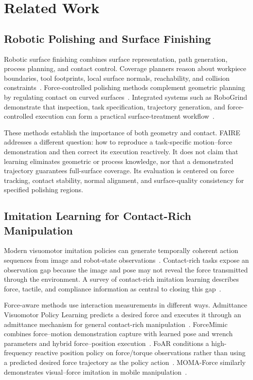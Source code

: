 \chapter{Related Work}
\label{chap:related_work}

\section{Robotic Polishing and Surface Finishing}
Robotic surface finishing combines surface representation, path generation, process planning, and contact control. Coverage planners reason about workpiece boundaries, tool footprints, local surface normals, reachability, and collision constraints~\cite{schneyer2023segmentation,mcgovern2024coverage,tafuro2024autonomous}. Force-controlled polishing methods complement geometric planning by regulating contact on curved surfaces~\cite{mohsin2019path,min2024force}. Integrated systems such as RoboGrind demonstrate that inspection, task specification, trajectory generation, and force-controlled execution can form a practical surface-treatment workflow~\cite{alt2024robogrind}.

These methods establish the importance of both geometry and contact. FAIRE addresses a different question: how to reproduce a task-specific motion--force demonstration and then correct its execution reactively. It does not claim that learning eliminates geometric or process knowledge, nor that a demonstrated trajectory guarantees full-surface coverage. Its evaluation is centered on force tracking, contact stability, normal alignment, and surface-quality consistency for specified polishing regions.

\section{Imitation Learning for Contact-Rich Manipulation}
Modern visuomotor imitation policies can generate temporally coherent action sequences from image and robot-state observations~\cite{zhao2023act,chi2025diffusionpolicy}. Contact-rich tasks expose an observation gap because the image and pose may not reveal the force transmitted through the environment. A survey of contact-rich imitation learning describes force, tactile, and compliance information as central to closing this gap~\cite{tsuji2025contactsurvey}.

Force-aware methods use interaction measurements in different ways. Admittance Visuomotor Policy Learning predicts a desired force and executes it through an admittance mechanism for general contact-rich manipulation~\cite{zhou2024admitdiff}. ForceMimic combines force--motion demonstration capture with learned pose and wrench parameters and hybrid force--position execution~\cite{liu2025forcemimic}. FoAR conditions a high-frequency reactive position policy on force/torque observations rather than using a predicted desired force trajectory as the policy action~\cite{he2025foar}. MOMA-Force similarly demonstrates visual--force imitation in mobile manipulation~\cite{yang2023momaforce}.


